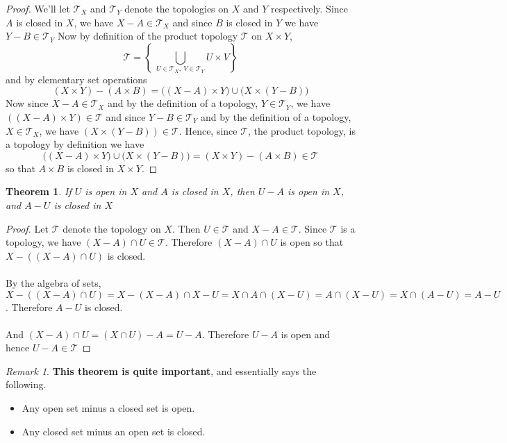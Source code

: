 \documentclass{article}
\newtheorem{theorem}{Theorem}[section]
\theoremstyle{remark}
\newtheorem*{remark}{Remark}
\theoremstyle{definition}
\begin{document}
\begin{proof}
We'll let $\mathcal{T}_X$ and $\mathcal{T}_Y$ denote the topologies on $X$ and $Y$ respectively. Since $A$ is closed in $X$, we have $X - A \in \mathcal{T}_X$ and since $B$ is closed in $Y$ we have $Y - B \in \mathcal{T}_Y$ Now by definition of the product topology $\mathcal{T}$ on $X \times Y$, $$\mathcal{T} = \left\{ \ \bigcup_{U \in \mathcal{T}_X, \ V \in \mathcal{T}_Y} U \times V \right\}$$ and by elementary set operations $$(X\times Y)-(A\times B)=\Big((X- A)\times Y\Big)\cup\Big(X\times(Y - B)\Big)$$
Now since $X - A \in \mathcal{T}_X$ and by the definition of a topology, $Y \in \mathcal{T}_Y$, we have $\left((X- A)\times Y\right) \in \mathcal{T}$ and since $Y - B \in \mathcal{T}_Y$ and by the definition of a topology, $X \in \mathcal{T}_X$, we have $\left(X\times(Y - B)\right) \in \mathcal{T}$. Hence, since $\mathcal{T}$, the product topology, is a topology by definition we have$$\Big((X- A)\times Y\Big)\cup\Big(X\times(Y - B)\Big) = (X\times Y)-(A\times B) \in \mathcal{T}$$ so that $A \times B$ is closed in $X \times Y$.
\end{proof}

\newpage

\begin{theorem}
If $U$ is open in $X$ and $A$ is closed in $X$, then $U-A$ is open in $X$, and $A-U$ is closed in $X$
\end{theorem}

\begin{proof}
Let $\mathcal{T}$ denote the topology on $X$. Then $U \in \mathcal{T}$ and $X-A \in \mathcal{T}$. Since $\mathcal{T}$ is a topology, we have $(X-A) \cap U \in \mathcal{T}$. Therefore $(X-A) \cap U$ is open so that $X - ((X-A) \cap U)$ is closed. \\ \\ By the algebra of sets, $X - ((X-A) \cap U) = X - (X-A) \cap X-U = X \cap A \cap (X-U) = A \cap (X-U) = X \cap (A-U) = A- U$. Therefore $A-U$ is closed. 
\\ \\
And $(X-A) \cap U = (X \cap U) - A = U-A$. Therefore $U-A$ is open and hence $U-A \in \mathcal{T}$
\end{proof}

\begin{remark}
\textbf{This theorem is quite important}, and essentially says the following. 
\begin{itemize}
  \item Any open set minus a closed set is open.
  \item Any closed set minus an open set is closed.
\end{itemize}
\end{remark}
\end{document}
